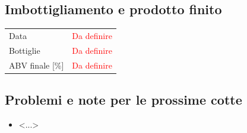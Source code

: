 \subsection*{Imbottigliamento e prodotto finito}
\begin{tabularx}{\linewidth}{@{}lX@{}}
\toprule
Data & \textcolor{red}{Da definire} \\
Bottiglie & \textcolor{red}{Da definire} \\
ABV finale [\si{\percent}] & \textcolor{red}{Da definire} \\
\bottomrule
\end{tabularx}

\subsection*{Problemi e note per le prossime cotte}
\begin{itemize}
  \item <...>
\end{itemize}
